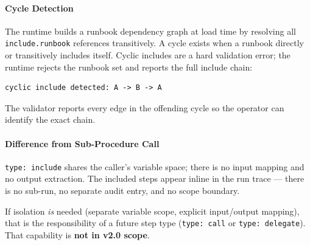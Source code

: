 \paragraph{Cycle Detection}
The runtime builds a runbook dependency graph at load time by resolving all
\texttt{include.runbook} references transitively.  A cycle exists when a runbook
directly or transitively includes itself.  Cyclic includes are a hard validation
error; the runtime rejects the runbook set and reports the full include chain:

\begin{verbatim}
cyclic include detected: A -> B -> A
\end{verbatim}

The validator reports every edge in the offending cycle so the operator can
identify the exact chain.

\paragraph{Difference from Sub-Procedure Call}
\texttt{type: include} shares the caller's variable space; there is no input
mapping and no output extraction.  The included steps appear inline in the run
trace — there is no sub-run, no separate audit entry, and no scope boundary.

If isolation \emph{is} needed (separate variable scope, explicit input/output
mapping), that is the responsibility of a future step type
(\texttt{type: call} or \texttt{type: delegate}).  That capability is
\textbf{not in v2.0 scope}.

